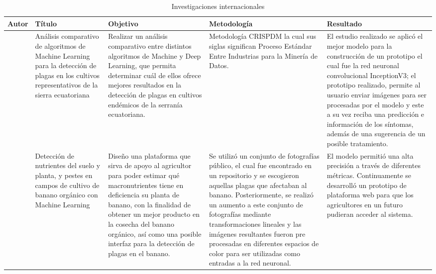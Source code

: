 \begin{longtable}{|p{2cm}|p{3cm}|p{3cm}|p{4cm}|p{3cm}|}

\caption{Investigaciones internacionales}\\
\hline
\textbf{Autor} & \textbf{Título} & \textbf{Objetivo} & \textbf{Metodología} & \textbf{Resultado} \\
\hline
\endhead

\citet{aimacana2021} & Análisis comparativo de algoritmos de Machine Learning para la detección de plagas en los cultivos representativos de la sierra ecuatoriana & Realizar un análisis comparativo entre distintos algoritmos de Machine y Deep Learning, que permita determinar cuál de ellos ofrece mejores resultados en la detección de plagas en cultivos endémicos de la serranía ecuatoriana. & Metodología CRISPDM la cual sus siglas significan Proceso Estándar Entre Industrias para la Minería de Datos. & El estudio realizado se aplicó el mejor modelo para la construcción de un prototipo el cual fue la red neuronal convolucional InceptionV3; el prototipo realizado, permite al usuario enviar imágenes para ser procesadas por el modelo y este a su vez reciba una predicción e información de los síntomas, además de una sugerencia de un posible tratamiento. \\
\hline
\citet{castaneda2021} & Detección de nutrientes del suelo y planta, y pestes en campos de cultivo de banano orgánico con Machine Learning & Diseño una plataforma que sirva de apoyo al agricultor para poder estimar qué macronutrientes tiene en deficiencia su planta de banano, con la finalidad de obtener un mejor producto en la cosecha del banano orgánico, así como una posible interfaz para la detección de plagas en el banano. & Se utilizó un conjunto de fotografías público, el cual fue encontrado en un repositorio y se escogieron aquellas plagas que afectaban al banano. Posteriormente, se realizó un aumento a este conjunto de fotografías mediante transformaciones lineales y las imágenes resultantes fueron pre procesadas en diferentes espacios de color para ser utilizadas como entradas a la red neuronal. & El modelo permitió una alta precisión a través de diferentes métricas. Continuamente se desarrolló un prototipo de plataforma web para que los agricultores en un futuro pudieran acceder al sistema. \\
\hline

\end{longtable}
